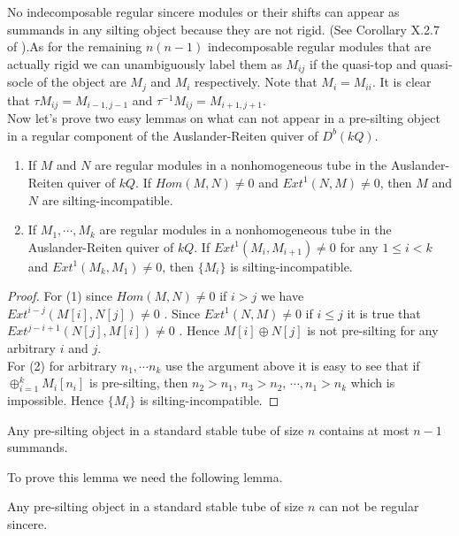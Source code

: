 \indent No indecomposable regular sincere modules or their shifts can appear as summands in any silting object because they are not rigid. (See Corollary X.2.7 of \cite{SS06}).As for the remaining $n(n-1)$ indecomposable regular modules that are actually rigid we can unambiguously label them as $M_{ij}$ if the quasi-top and quasi-socle of the object are $M_j$ and $M_i$ respectively. Note that $M_i=M_{ii}$. It is clear that $\tau M_{ij}=M_{i-1,j-1}$ and $\tau^{-1} M_{ij}=M_{i+1,j+1}$.\\
\indent Now let's prove two easy lemmas on what can not appear in a pre-silting object in a regular component of the Auslander-Reiten quiver of $D^b(kQ)$.\\
\begin{lemma}
\begin{enumerate}
\item If $M$ and $N$ are regular modules in a nonhomogeneous tube in the Auslander-Reiten quiver of $kQ$. If $Hom(M,N)\neq 0$ and $Ext^1(N,M)\neq 0$, then $M$ and $N$ are silting-incompatible.\\
\item If $M_1,\cdots, M_k$ are regular modules in a nonhomogeneous tube in the Auslander-Reiten quiver of $kQ$. If $Ext^1(M_i,M_{i+1})\neq 0$ for any $1\leq i<k$  and $Ext^1(M_k,M_1)\neq 0$, then $\{M_i\}$  is silting-incompatible.\\
\end{enumerate}
\end{lemma}
\begin{proof}
\indent For (1) since $Hom(M,N)\neq 0$ if $i>j$ we have $Ext^{i-j}(M[i],N[j])\neq 0$ . Since $Ext^1(N,M)\neq 0$ if $i\leq j$ it is true that $Ext^{j-i+1}(N[j],M[i])\neq 0$ . Hence $M[i]\oplus N[j]$ is not pre-silting for any arbitrary $i$ and $j$.\\
\indent For (2) for arbitrary $n_1,\cdots n_k$ use the argument above it is easy to see that if $\oplus_{i=1}^kM_i[n_i]$ is pre-silting, then $n_2>n_1$, $n_3>n_2$, $\cdots, n_1>n_k$ which is impossible. Hence $\{M_i\}$  is silting-incompatible.
\end{proof}
\begin{lemma}\label{def:C3L3}
Any pre-silting object in a standard stable tube of size $n$ contains at most $n-1$ summands.
\end{lemma}
\indent To prove this lemma we need the following lemma.
\begin{lemma}\label{lem:C3L4}
Any pre-silting object in a standard stable tube of size $n$ can not be regular sincere.
\end{lemma}

